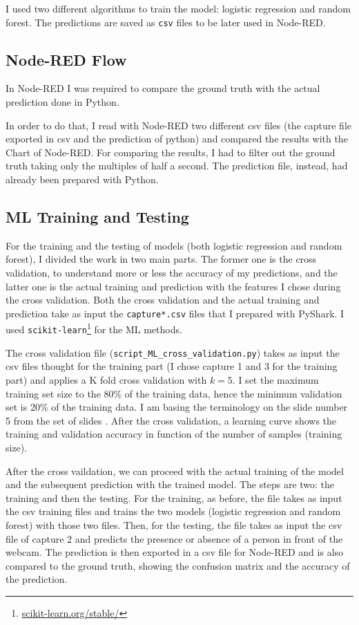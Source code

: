 \documentclass[12pt, conference]{IEEEtran}
\begin{document}
I used two different algorithms to train the model: logistic regression and random forest. The predictions are saved as \texttt{csv} files to be later used in Node-RED.

\subsection{Node-RED Flow}
In Node-RED I was required to compare the ground truth with the actual prediction done in Python.

In order to do that, I read with Node-RED two different csv files (the capture file exported in csv and the prediction of python) and compared the results with the Chart of Node-RED. For comparing the results, I had to filter out the ground truth taking only the multiples of half a second. The prediction file, instead, had already been prepared with Python.

\subsection{ML Training and Testing}
For the training and the testing of models (both logistic regression and random forest), I divided the work in two main parts. The former one is the cross validation, to understand more or less the accuracy of my predictions, and the latter one is the actual training and prediction with the features I chose during the cross validation. Both the cross validation and the actual training and prediction take as input the \texttt{capture*.csv} files that I prepared with PyShark. I used \texttt{scikit-learn}\footnote{\href{https://scikit-learn.org/stable/}{scikit-learn.org/stable/}} for the ML methods.

The cross validation file (\texttt{script\_ML\_cross\_validation.py}) takes as input the csv files thought for the training part (I chose capture 1 and 3 for the training part) and applies a K fold cross validation with $k=5$. I set the maximum training set size to the 80\% of the training data, hence the minimum validation set is 20\% of the training data. I am basing the terminology on the slide number 5 from the set of slides \cite{matteucci2022neuralnetworkstraining}. After the cross validation, a learning curve shows the training and validation accuracy in function of the number of samples (training size).

After the cross vaildation, we can proceed with the actual training of the model and the subsequent prediction with the trained model. The steps are two: the training and then the testing. For the training, as before, the file takes as input the csv training files and trains the two models (logistic regression and random forest) with those two files. Then, for the testing, the file takes as input the csv file of capture 2 and predicts the presence or absence of a person in front of the webcam. The prediction is then exported in a csv file for Node-RED and is also compared to the ground truth, showing the confusion matrix and the accuracy of the prediction.
\end{document}

